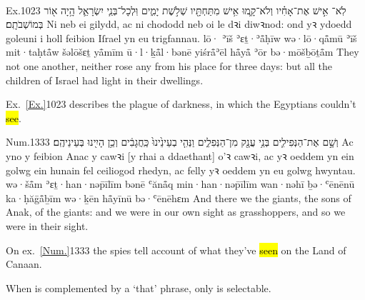 \paragraph{}


\begin{example}{Ex.}{10}{23}{}{}
	\quoling
	{לֹֽא־ אִ֣ישׁ אֶת־אָחִ֗יו וְלֹא־קָ֛מוּ אִ֥ישׁ מִתַּחְתָּ֖יו שְׁלֹ֣שֶׁת יָמִ֑ים וּֽלְכָל־בְּנֵ֧י יִשְׂרָאֵ֛ל הָ֥יָה א֖וֹר בְּמוֹשְׁבֹתָֽם׃}
	{Ni  neb ei gilydd, ac ni chododd neb oi le dꝛi diwꝛnod: ond yꝛ ydoedd goleuni i holl feibion Iſrael yn eu trigfannau.}
	{lō· ʾīš ʾɛṯ·ʾå̄ḥīw wə·lō·qå̄mū ʾīš mit·taḥtå̄w šəlōšɛṯ yå̄mīm ū·l·ḵå̄l·bənē yiśrå̄ʾēl hå̄yå̄ ʾōr bə·mōšḇōṯå̄m}
	{They  not one another, neither rose any from his place for three days: but all the children of Israel had light in their dwellings.}
\end{example}
\begin{paper}
	\explain Ex.~\vref{Ex.}{10}{23}{} describes the plague of darkness, in which the Egyptians couldn’t \hl{see}.
\end{paper}

\begin{example}{Num.}{13}{33}{}{}
	\quoling
	{וְשָׁ֣ם  אֶת־הַנְּפִילִ֛ים בְּנֵ֥י עֲנָ֖ק מִן־הַנְּפִלִ֑ים וַנְּהִ֤י בְעֵינֵ֙ינוּ֙ כַּֽחֲגָבִ֔ים וְכֵ֥ן הָיִ֖ינוּ בְּעֵינֵיהֶֽם׃}
	{Ac yno y  feibion Anac y cawꝛi [y rhai a ddaethant] o’ꝛ cawꝛi, ac yꝛ oeddem yn ein golwg ein hunain fel ceiliogod rhedyn, ac felly yꝛ oeddem yn eu golwg hwyntau.}
	{wə·šå̄m  ʾɛṯ·han·nəp̄īlīm bənē ʿănå̄q min·han·nəp̄īlīm wan·nəhī ḇə·ʿēnēnū ka·ḥăḡå̄ḇīm wə·ḵēn hå̄yīnū bə·ʿēnēhɛm}
	{And there we  the giants, the sons of Anak,  of the giants: and we were in our own sight as grasshoppers, and so we were in their sight.}
\end{example}
\begin{paper}
	\explain On ex.~\vref{Num.}{13}{33}{} the spies tell account of what they’ve \hl{seen} on the Land of Canaan.
\end{paper}




\begin{paper}
	{\click} When  is complemented by a  ‘that’ phrase, only  is selectable.
\end{paper}

